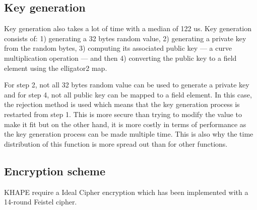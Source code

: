 \documentclass[../report.tex]{subfiles}
\begin{document}
\pgfplotsset{width=\textwidth-2.4cm}
\pgfplotsset{height=4cm}


\subsection{Key generation}
Key generation also takes a lot of time with a median of 122 us. Key generation consists of: 1) generating a 32 bytes random value, 2) generating a private key from the random bytes, 3) computing its associated public key --- a curve multiplication operation --- and then 4) converting the public key to a field element using the elligator2 map.

For step 2, not all 32 bytes random value can be used to generate a private key and for step 4, not all public key can be mapped to a field element.
In this case, the rejection method is used which means that the key generation process is restarted from step 1. This is more secure than trying to modify the value to make it fit but on the other hand, it is more costly in terms of performance as the key generation process can be made multiple time.
This is also why the time distribution of this function is more spread out than for other functions.


\pgfplotsset{width=\textwidth-0.3cm}
\pgfplotsset{height=4cm}


\subsection{Encryption scheme}
KHAPE require a Ideal Cipher encryption which has been implemented with a 14-round Feistel cipher.
\end{document}

